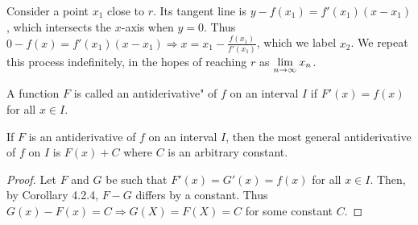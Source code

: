 \documentclass[a4paper,8pt]{article}
\begin{document}
\begin{outline}
    \begin{justification}
      Consider a point \(x_1\) close to \(r\). Its tangent line is \(y - f(x_1) = f'(x_1)(x - x_1)\), which
      intersects the \(x\)-axis when \(y = 0\). Thus \(0 - f(x) = f'(x_1)(x-x_1) \Rightarrow x = x_1 -
      \frac{f(x_1)}{f'(x_1)}\), which we label \(x_2\). We repeat this process indefinitely, in the hopes of reaching
      \(r\) as \(\lim\limits_{n\rightarrow \infty^{}}x_n\).
    \end{justification}

    A function \(F\) is called an antiderivative" of \(f\) on an interval \(I\) if \(F'(x) = f(x)\) for all \(x \in I\).

    If \(F\) is an antiderivative of \(f\) on an interval \(I\), then the most general antiderivative of \(f\) on \(I\)
    is \(F(x) + C\) where \(C\) is an arbitrary constant.

    \begin{proof}
      Let \(F\) and \(G\) be such that \(F'(x) = G'(x) = f(x)\) for all \(x \in I\). Then, by Corollary 4.2.4, \(F-G\)
      differs by a constant. Thus \(G(x)-F(x)=C \Rightarrow G(X) = F(X) = C\) for some constant \(C\).
    \end{proof}

\end{outline}
\end{document}
